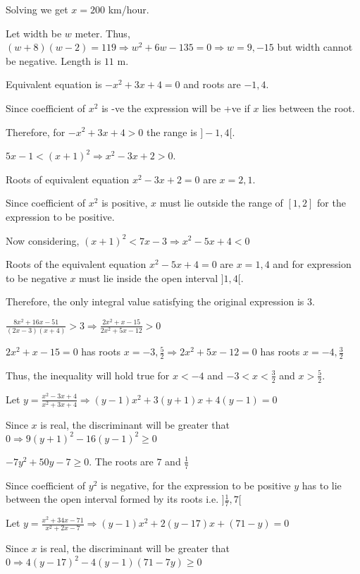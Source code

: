   Solving we get $x = 200$ km/hour.
\item Let width be $w$ meter. Thus, $(w + 8)(w - 2) = 119\Rightarrow w^2 + 6w - 135 = 0\Rightarrow w = 9,
  -15$ but width cannot be negative. Length is $11$ m.
\item Equivalent equation is $-x^2 + 3x + 4 = 0$ and roots are $-1, 4$.

  Since coefficient of $x^2$ is -ve the expression will be +ve if $x$ lies between the root.

  Therefore, for $-x^2 + 3x + 4 > 0$ the range is $]-1, 4[$.
\item $5x - 1 < (x + 1)^2 \Rightarrow x^2 - 3x + 2 > 0$.

  Roots of equivalent equation $x^2 - 3x + 2 = 0$ are $x = 2, 1$.

  Since coefficient of $x^2$ is positive, $x$ must lie outside the range of $[1, 2]$ for the expression
  to be positive.

  Now considering, $(x + 1)^2 < 7x - 3\Rightarrow x^2 - 5x + 4 < 0$

  Roots of the equivalent equation $x^2 - 5x + 4 = 0$ are $x = 1, 4$ and for expression to be negative $x$
  must lie inside the open interval $]1, 4[$.

  Therefore, the only integral value satisfying the original expression is $3$.
\item $\frac{8x^2 + 16x - 51}{(2x - 3)(x + 4)} > 3\Rightarrow \frac{2x^2 + x - 15}{2x^2 + 5x - 12} > 0$

  $2x^2 + x - 15 = 0$ has roots $x = -3 , \frac{5}{2}\Rightarrow 2x^2 + 5x - 12 = 0$ has roots $x = -4,
  \frac{3}{2}$

  Thus, the inequality will hold true for $x < -4$ and $-3 < x < \frac{3}{2}$ and $x > \frac{5}{2}$.
\item Let $y = \frac{x^2 - 3x + 4}{x^2 + 3x + 4}\Rightarrow (y - 1)x^2 + 3(y + 1)x + 4(y - 1) = 0$

  Since $x$ is real, the discriminant will be greater that $0 \Rightarrow 9(y + 1)^2 - 16(y - 1)^2 \ge 0$

  $-7y^2 + 50y - 7 \ge 0$. The roots are $7$ and $\frac{1}{7}$

  Since coefficient of $y^2$ is negative, for the expression to be positive $y$ has to lie between the
  open interval formed by its roots i.e. $]\frac{1}{7}, 7[$
\item Let $y = \frac{x^2 + 34x - 71}{x^2 + 2x - 7}\Rightarrow (y - 1)x^2 + 2(y - 17)x + (71 - y) = 0$

  Since $x$ is real, the discriminant will be greater that $0\Rightarrow 4(y - 17)^2 - 4(y - 1)(71 - 7y) \ge
  0$

